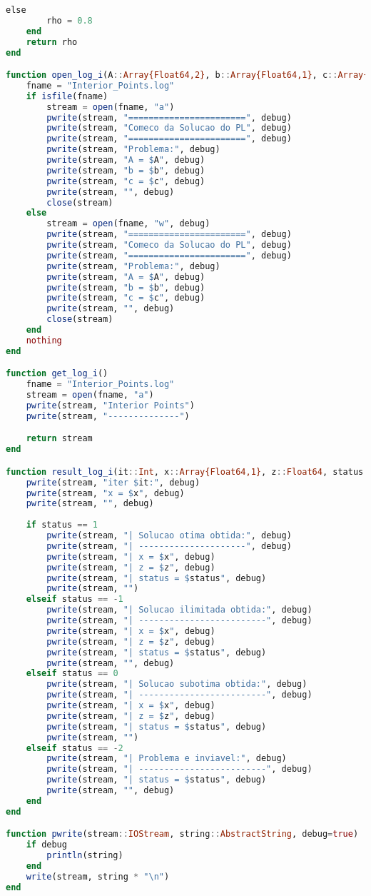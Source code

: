 \documentclass[a4paper]{IEEEtran}
\begin{document}
\begin{lstlisting}[language=Julia,numbers=none]
    else
        rho = 0.8
    end
    return rho
end 

function open_log_i(A::Array{Float64,2}, b::Array{Float64,1}, c::Array{Float64,1}, debug=true)
    fname = "Interior_Points.log"
    if isfile(fname)
        stream = open(fname, "a")
        pwrite(stream, "=======================", debug)
        pwrite(stream, "Comeco da Solucao do PL", debug)
        pwrite(stream, "=======================", debug)
        pwrite(stream, "Problema:", debug)
        pwrite(stream, "A = $A", debug)
        pwrite(stream, "b = $b", debug)
        pwrite(stream, "c = $c", debug)
        pwrite(stream, "", debug)
        close(stream)
    else
        stream = open(fname, "w", debug)
        pwrite(stream, "=======================", debug)
        pwrite(stream, "Comeco da Solucao do PL", debug)
        pwrite(stream, "=======================", debug)
        pwrite(stream, "Problema:", debug)
        pwrite(stream, "A = $A", debug)
        pwrite(stream, "b = $b", debug)
        pwrite(stream, "c = $c", debug)
        pwrite(stream, "", debug)
        close(stream)
    end
    nothing
end

function get_log_i()
    fname = "Interior_Points.log"
    stream = open(fname, "a")
    pwrite(stream, "Interior Points")
    pwrite(stream, "--------------")

    return stream
end

function result_log_i(it::Int, x::Array{Float64,1}, z::Float64, status::Int, stream::IOStream, debug=true)
    pwrite(stream, "iter $it:", debug)
    pwrite(stream, "x = $x", debug)
    pwrite(stream, "", debug)
    
    if status == 1
        pwrite(stream, "| Solucao otima obtida:", debug)
        pwrite(stream, "| ---------------------", debug)
        pwrite(stream, "| x = $x", debug)
        pwrite(stream, "| z = $z", debug)
        pwrite(stream, "| status = $status", debug)
        pwrite(stream, "")
    elseif status == -1
        pwrite(stream, "| Solucao ilimitada obtida:", debug)
        pwrite(stream, "| -------------------------", debug)
        pwrite(stream, "| x = $x", debug)
        pwrite(stream, "| z = $z", debug)
        pwrite(stream, "| status = $status", debug)
        pwrite(stream, "", debug)
    elseif status == 0 
        pwrite(stream, "| Solucao subotima obtida:", debug)
        pwrite(stream, "| -------------------------", debug)
        pwrite(stream, "| x = $x", debug)
        pwrite(stream, "| z = $z", debug)
        pwrite(stream, "| status = $status", debug)
        pwrite(stream, "")
    elseif status == -2 
        pwrite(stream, "| Problema e inviavel:", debug)
        pwrite(stream, "| -------------------------", debug)
        pwrite(stream, "| status = $status", debug)
        pwrite(stream, "", debug)
    end
end

function pwrite(stream::IOStream, string::AbstractString, debug=true)
    if debug
        println(string)
    end
    write(stream, string * "\n")
end

\end{lstlisting}
\end{document}
